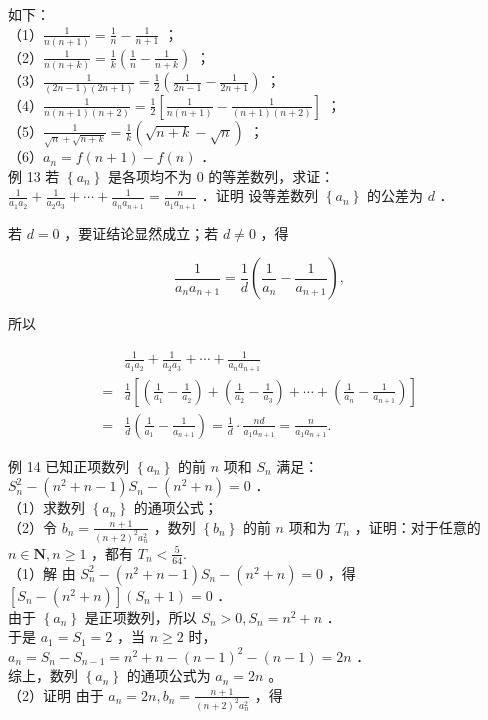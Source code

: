 \documentclass[10pt]{article}
\begin{document}
如下：\\
（1）\(\frac{1}{n(n+1)}=\frac{1}{n}-\frac{1}{n+1}\) ；\\
（2）\(\frac{1}{n(n+k)}=\frac{1}{k}\left(\frac{1}{n}-\frac{1}{n+k}\right)\) ；\\
（3）\(\frac{1}{(2 n-1)(2 n+1)}=\frac{1}{2}\left(\frac{1}{2 n-1}-\frac{1}{2 n+1}\right)\) ；\\
（4）\(\frac{1}{n(n+1)(n+2)}=\frac{1}{2}\left[\frac{1}{n(n+1)}-\frac{1}{(n+1)(n+2)}\right]\) ；\\
（5）\(\frac{1}{\sqrt{n}+\sqrt{n+k}}=\frac{1}{k}(\sqrt{n+k}-\sqrt{n})\) ；\\
（6）\(a_{n}=f(n+1)-f(n)\) ．\\
例 13 若 \(\left\{a_{n}\right\}\) 是各项均不为 0 的等差数列，求证：\(\frac{1}{a_{1} a_{2}}+\frac{1}{a_{2} a_{3}}+\cdots+\frac{1}{a_{n} a_{n+1}}=\frac{n}{a_{1} a_{n+1}}\) ．证明 设等差数列 \(\left\{a_{n}\right\}\) 的公差为 \(d\) ．

若 \(d=0\) ，要证结论显然成立；若 \(d \neq 0\) ，得

\[
\frac{1}{a_{n} a_{n+1}}=\frac{1}{d}\left(\frac{1}{a_{n}}-\frac{1}{a_{n+1}}\right),
\]

所以

\[
\begin{aligned}
& \frac{1}{a_{1} a_{2}}+\frac{1}{a_{2} a_{3}}+\cdots+\frac{1}{a_{n} a_{n+1}} \\
= & \frac{1}{d}\left[\left(\frac{1}{a_{1}}-\frac{1}{a_{2}}\right)+\left(\frac{1}{a_{2}}-\frac{1}{a_{3}}\right)+\cdots+\left(\frac{1}{a_{n}}-\frac{1}{a_{n+1}}\right)\right] \\
= & \frac{1}{d}\left(\frac{1}{a_{1}}-\frac{1}{a_{n+1}}\right)=\frac{1}{d} \cdot \frac{n d}{a_{1} a_{n+1}}=\frac{n}{a_{1} a_{n+1}} .
\end{aligned}
\]

例 14 已知正项数列 \(\left\{a_{n}\right\}\) 的前 \(n\) 项和 \(S_{n}\) 满足：\(S_{n}^{2}-\left(n^{2}+n-1\right) S_{n}-\left(n^{2}+n\right)=0\) ．\\
（1）求数列 \(\left\{a_{n}\right\}\) 的通项公式；\\
（2）令 \(b_{n}=\frac{n+1}{(n+2)^{2} a_{n}^{2}}\) ，数列 \(\left\{b_{n}\right\}\) 的前 \(n\) 项和为 \(T_{n}\) ，证明：对于任意的 \(n \in \mathbf{N}, n \geqslant 1\) ，都有 \(T_{n}<\frac{5}{64}\).\\
（1）解 由 \(S_{n}^{2}-\left(n^{2}+n-1\right) S_{n}-\left(n^{2}+n\right)=0\) ，得 \(\left[S_{n}-\left(n^{2}+n\right)\right]\left(S_{n}+1\right)=0\) ．\\
由于 \(\left\{a_{n}\right\}\) 是正项数列，所以 \(S_{n}>0, S_{n}=n^{2}+n\) ．\\
于是 \(a_{1}=S_{1}=2\) ，当 \(n \geqslant 2\) 时，\(a_{n}=S_{n}-S_{n-1}=n^{2}+n-(n-1)^{2}-(n-1)=2 n\) ．\\
综上，数列 \(\left\{a_{n}\right\}\) 的通项公式为 \(a_{n}=2 n\) 。\\
（2）证明 由于 \(a_{n}=2 n, b_{n}=\frac{n+1}{(n+2)^{2} a_{n}^{2}}\) ，得
\end{document}
